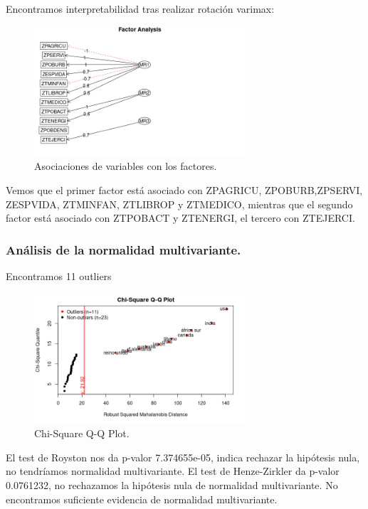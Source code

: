 \documentclass[11pt,a4paper]{article}
\begin{document}
	Encontramos interpretabilidad tras realizar rotación varimax:
	\begin{figure}[H]
		\centering
		\includegraphics[width=0.7\textwidth]{images/inter_fa}
		\caption{Asociaciones de variables con los factores.}
	\end{figure}
	
	Vemos que el primer factor está asociado con ZPAGRICU, ZPOBURB,ZPSERVI, ZESPVIDA, ZTMINFAN, ZTLIBROP y ZTMEDICO, mientras que el segundo factor está asociado con ZTPOBACT y ZTENERGI, el tercero con ZTEJERCI.
	\subsubsection{Análisis de la normalidad multivariante.}
	Encontramos 11 outliers 
	\begin{figure}[H]
		\centering
		\includegraphics[width=0.7\textwidth]{images/out_mult}
		\caption{Chi-Square Q-Q Plot.}
	\end{figure}
	
	El test de Royston nos da p-valor 7.374655e-05, indica rechazar la hipótesis nula, no tendríamos normalidad multivariante. El test de Henze-Zirkler da p-valor 0.0761232, no rechazamos la hipótesis nula de normalidad multivariante. No encontramos suficiente evidencia de normalidad multivariante.
\end{document}
